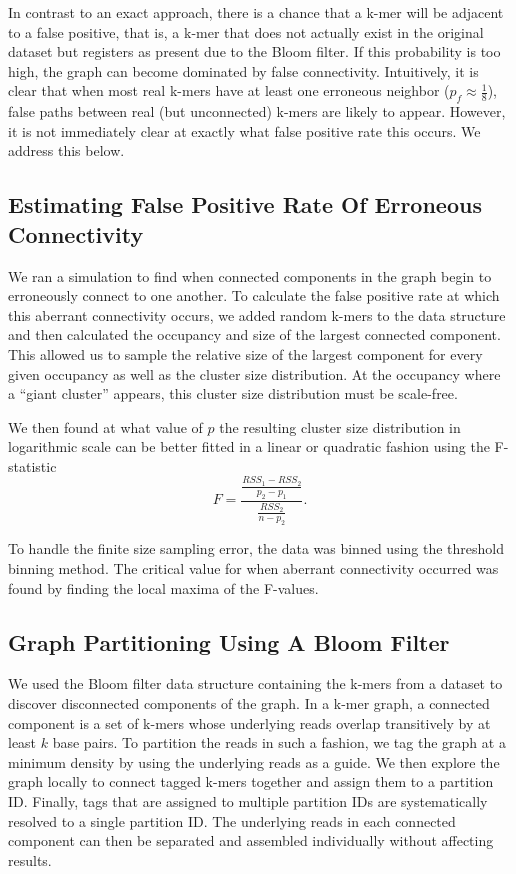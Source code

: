 \documentclass[12pt]{article} \usepackage{simplemargins}
\begin{document}
In contrast to an exact approach, there is a chance that a k-mer 
will be adjacent to a false positive,
that is, a k-mer
that does not actually exist in the original dataset but registers as present  
due to 
the Bloom filter. If this probability is too high, the 
graph can become dominated by false connectivity. 
Intuitively, it is clear that when most real k-mers
have at least one erroneous neighbor ($p_f \approx \frac{1}{8}$), 
false paths between real (but unconnected) k-mers are likely to 
appear. However, it is not immediately clear at exactly what 
false positive rate this occurs. We address this below.  %

\subsection{Estimating False Positive Rate Of Erroneous Connectivity}
We ran a simulation to find when connected components in the graph 
begin to erroneously connect to one another.
To calculate the false positive rate at which this aberrant 
connectivity occurs, 
we added random k-mers to the data structure 
and then calculated the occupancy and size of 
the largest connected 
component. This allowed us to sample the relative size of 
the largest component for every 
given occupancy as well as the cluster size distribution. 
At the occupancy where a ``giant cluster'' appears, this cluster size distribution 
must be scale-free\cite{stauffer1979scaling}. 

We then found at what value of $p$ the resulting 
cluster size distribution in logarithmic 
scale can be better fitted in a linear or quadratic fashion using 
the F-statistic
\newline
\newline
\begin{displaymath}
F=\frac{\frac{RSS_1-RSS_2}{p_2-p_1}}{\frac{RSS_2}{n-p_2}}.
\end{displaymath}

To handle the finite size sampling error, the data was binned using the 
threshold binning method\cite{adami2002critical}. The critical value for 
when aberrant connectivity occurred was found by finding the local maxima 
of the F-values.

\subsection{Graph Partitioning Using A Bloom Filter}
We used the Bloom filter data structure containing the k-mers from a dataset 
to discover disconnected components of the graph. In a k-mer graph, a connected 
component is a set of k-mers whose underlying reads overlap 
transitively by at least $k$ base pairs. 
To partition the reads in such a fashion, we tag the 
graph at a minimum density by using the underlying reads as a guide. We then
explore the graph locally to connect tagged k-mers together and assign them 
to a partition ID. Finally, tags that are assigned to multiple partition IDs 
are systematically resolved to a single partition ID.  
The underlying reads in each connected component can then 
be separated and assembled individually without affecting results.
\end{document}
